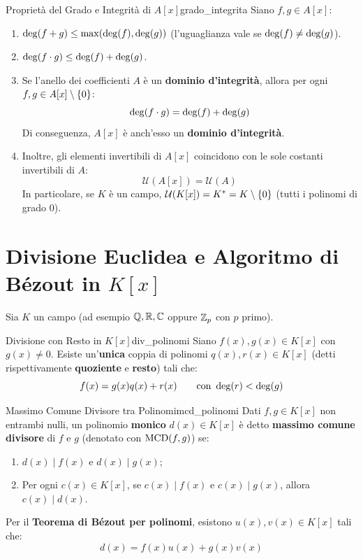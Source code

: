 \begin{teorema}{Proprietà del Grado e Integrità di $A[x]$}{grado_integrita}
Siano $f, g \in A[x]$:
\begin{enumerate}
    \item $\operatorname{deg}(f + g) \le \max(\operatorname{deg}(f), \operatorname{deg}(g))$ (l'uguaglianza vale se $\operatorname{deg}(f) \neq \operatorname{deg}(g)$).
    \item $\operatorname{deg}(f \cdot g) \le \operatorname{deg}(f) + \operatorname{deg}(g)$.
    \item Se l'anello dei coefficienti $A$ è un \textbf{dominio d'integrità}, allora per ogni $f, g \in A[x] \setminus \{0\}$:
    \[
        \operatorname{deg}(f \cdot g) = \operatorname{deg}(f) + \operatorname{deg}(g)
    \]
    Di conseguenza, $A[x]$ è anch'esso un \textbf{dominio d'integrità}.
    \item Inoltre, gli elementi invertibili di $A[x]$ coincidono con le sole costanti invertibili di $A$:
    \[
        \mathcal{U}(A[x]) = \mathcal{U}(A)
    \]
    In particolare, se $K$ è un campo, $\mathcal{U}(K[x]) = K^* = K \setminus \{0\}$ (tutti i polinomi di grado 0).
\end{enumerate}
\end{teorema}

\section{Divisione Euclidea e Algoritmo di Bézout in $K[x]$}

Sia $K$ un campo (ad esempio $\mathbb{Q}, \mathbb{R}, \mathbb{C}$ oppure $\mathbb{Z}_p$ con $p$ primo).

\begin{teorema}{Divisione con Resto in $K[x]$}{div_polinomi}
Siano $f(x), g(x) \in K[x]$ con $g(x) \neq 0$. Esiste un'\textbf{unica} coppia di polinomi $q(x), r(x) \in K[x]$ (detti rispettivamente \textbf{quoziente} e \textbf{resto}) tali che:
\[
    f(x) = g(x) q(x) + r(x) \qquad \text{con } \operatorname{deg}(r) < \operatorname{deg}(g)
\]
\end{teorema}

\begin{definizione}{Massimo Comune Divisore tra Polinomi}{mcd_polinomi}
Dati $f, g \in K[x]$ non entrambi nulli, un polinomio \textbf{monico} $d(x) \in K[x]$ è detto \textbf{massimo comune divisore} di $f$ e $g$ (denotato con $\operatorname{MCD}(f, g)$) se:
\begin{enumerate}
    \item $d(x) \mid f(x)$ e $d(x) \mid g(x)$;
    \item Per ogni $c(x) \in K[x]$, se $c(x) \mid f(x)$ e $c(x) \mid g(x)$, allora $c(x) \mid d(x)$.
\end{enumerate}
Per il \textbf{Teorema di Bézout per polinomi}, esistono $u(x), v(x) \in K[x]$ tali che:
\[
    d(x) = f(x)u(x) + g(x)v(x)
\]
\end{definizione}


